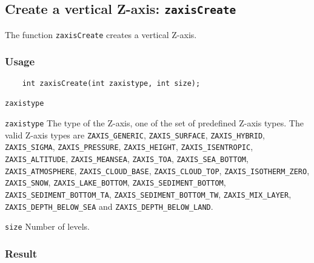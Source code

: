 

\subsection{Create a vertical Z-axis: \texttt{zaxisCreate}}
\label{zaxisCreate}

The function {\texttt{zaxisCreate}} creates a vertical Z-axis.

\subsubsection*{Usage}

\begin{verbatim}
    int zaxisCreate(int zaxistype, int size);
\end{verbatim}

\hspace*{4mm}\begin{minipage}[]{15cm}
\begin{deflist}{\texttt{zaxistype}\ }
\item[\texttt{zaxistype}]
The type of the Z-axis, one of the set of predefined {\CDI} Z-axis types.
                      The valid {\CDI} Z-axis types are {\texttt{ZAXIS\_GENERIC}}, {\texttt{ZAXIS\_SURFACE}},
                      {\texttt{ZAXIS\_HYBRID}}, {\texttt{ZAXIS\_SIGMA}}, {\texttt{ZAXIS\_PRESSURE}}, {\texttt{ZAXIS\_HEIGHT}},
                      {\texttt{ZAXIS\_ISENTROPIC}}, {\texttt{ZAXIS\_ALTITUDE}}, {\texttt{ZAXIS\_MEANSEA}}, {\texttt{ZAXIS\_TOA}},
                      {\texttt{ZAXIS\_SEA\_BOTTOM}}, {\texttt{ZAXIS\_ATMOSPHERE}}, {\texttt{ZAXIS\_CLOUD\_BASE}},
                      {\texttt{ZAXIS\_CLOUD\_TOP}}, {\texttt{ZAXIS\_ISOTHERM\_ZERO}}, {\texttt{ZAXIS\_SNOW}},
                      {\texttt{ZAXIS\_LAKE\_BOTTOM}}, {\texttt{ZAXIS\_SEDIMENT\_BOTTOM}}, {\texttt{ZAXIS\_SEDIMENT\_BOTTOM\_TA}},
                      {\texttt{ZAXIS\_SEDIMENT\_BOTTOM\_TW}}, {\texttt{ZAXIS\_MIX\_LAYER}},
                      {\texttt{ZAXIS\_DEPTH\_BELOW\_SEA}} and {\texttt{ZAXIS\_DEPTH\_BELOW\_LAND}}.
\item[\texttt{size}]
Number of levels.

\end{deflist}
\end{minipage}

\subsubsection*{Result}

